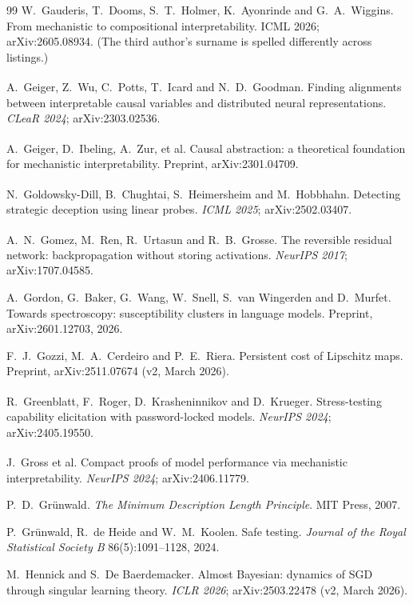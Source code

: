 \documentclass[11pt,a4paper]{article}
\newcommand{\unv}{\textsuperscript{\dag}}
\begin{document}
\begin{thebibliography}{99}
 W.~Gauderis, T.~Dooms, S.~T.~Holmer, K.~Ayonrinde
and G.~A.~Wiggins. From mechanistic to compositional interpretability.
ICML 2026; arXiv:2605.08934. (The third author's surname is spelled
differently across listings.)

\unv{} A.~Geiger, Z.~Wu, C.~Potts, T.~Icard and
N.~D.~Goodman. Finding alignments between interpretable causal variables
and distributed neural representations. \emph{CLeaR 2024};
arXiv:2303.02536.

\unv{} A.~Geiger, D.~Ibeling, A.~Zur, et al. Causal
abstraction: a theoretical foundation for mechanistic interpretability.
Preprint, arXiv:2301.04709.

\unv{} N.~Goldowsky-Dill, B.~Chughtai,
S.~Heimersheim and M.~Hobbhahn. Detecting strategic deception using
linear probes. \emph{ICML 2025}; arXiv:2502.03407.

\unv{} A.~N.~Gomez, M.~Ren, R.~Urtasun and R.~B.~Grosse.
The reversible residual network: backpropagation without storing
activations. \emph{NeurIPS 2017}; arXiv:1707.04585.

 A.~Gordon, G.~Baker, G.~Wang, W.~Snell, S.~van
Wingerden and D.~Murfet. Towards spectroscopy: susceptibility clusters in
language models. Preprint, arXiv:2601.12703, 2026.

 F.~J.~Gozzi, M.~A.~Cerdeiro and P.~E.~Riera. Persistent
cost of Lipschitz maps. Preprint, arXiv:2511.07674 (v2, March 2026).

\unv{} R.~Greenblatt, F.~Roger, D.~Krasheninnikov
and D.~Krueger. Stress-testing capability elicitation with password-locked
models. \emph{NeurIPS 2024}; arXiv:2405.19550.

\unv{} J.~Gross et al. Compact proofs of model
performance via mechanistic interpretability. \emph{NeurIPS 2024};
arXiv:2406.11779.

 P.~D.~Gr\"unwald. \emph{The Minimum Description
Length Principle}. MIT Press, 2007.

 P.~Gr\"unwald, R.~de Heide and W.~M.~Koolen.
Safe testing. \emph{Journal of the Royal Statistical Society B}
86(5):1091--1128, 2024.

 M.~Hennick and S.~De Baerdemacker. Almost Bayesian: dynamics of SGD through singular learning theory. \emph{ICLR 2026};
arXiv:2503.22478 (v2, March 2026).


\end{thebibliography}
\end{document}
